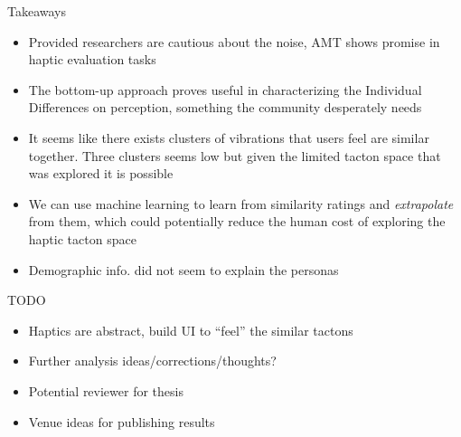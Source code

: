 \documentclass[table]{beamer}
\begin{document}
\begin{frame}{Takeaways}

\begin{itemize}
    
    \item Provided researchers are cautious about the noise, AMT shows promise in haptic evaluation tasks
    \item The bottom-up approach proves useful in characterizing the Individual Differences on perception, something the community desperately needs
    \item It seems like there exists clusters of vibrations that users feel are similar together. Three clusters seems low but given the limited tacton space that was explored it is possible
    \item We can use machine learning to learn from similarity ratings and \textit{extrapolate} from them, which could potentially reduce the human cost of exploring the haptic tacton space
    \item Demographic info. did not seem to explain the personas
\end{itemize}
\end{frame}





\begin{frame}{TODO}

\begin{itemize}
    \item Haptics are abstract, build UI to ``feel'' the similar tactons
    \item Further analysis ideas/corrections/thoughts? 
    \item Potential reviewer for thesis
    \item Venue ideas for publishing results
\end{itemize}
    
\end{frame}







\frame[plain]{

  \centering
  \color{titlecolor}{\Large Thank you!}

}
\end{document}
